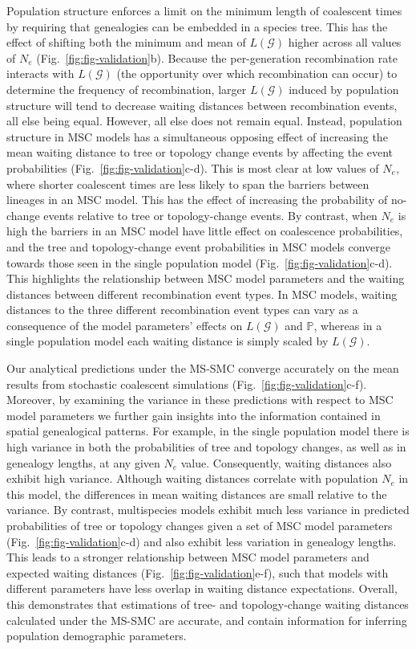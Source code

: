 \documentclass[11pt]{article}
\begin{document}
Population structure enforces a 
limit on the minimum length of coalescent 
times by requiring that genealogies can be embedded in a species tree.
This has the effect of shifting both the minimum and mean of 
$L(\mathcal{G})$ higher 
across all values of $N_e$ (Fig.~\ref{fig:fig-validation}b). 
Because the per-generation recombination rate interacts with
$L(\mathcal{G})$ (the opportunity over which recombination can occur) to
determine the frequency of recombination, larger $L(\mathcal{G})$ induced
by population structure will tend to decrease waiting distances between 
recombination events, all else being equal. 
However, all else does not remain equal.
Instead, population structure in MSC models has a simultaneous opposing effect
of increasing the mean waiting distance to tree or topology change events by 
affecting the event probabilities
(Fig.~\ref{fig:fig-validation}c-d).
This is most clear at low values of $N_e$, where shorter coalescent times are
less likely to span the barriers between lineages in an MSC model. 
This has the effect of increasing the probability of no-change events
relative to tree or topology-change events. By contrast, when $N_e$ is high the 
barriers in an MSC model have little effect on coalescence probabilities, and 
the tree and topology-change event probabilities in MSC models converge towards 
those seen in the single population model
(Fig.~\ref{fig:fig-validation}c-d). 
This highlights the relationship between MSC model parameters and the waiting 
distances between different recombination event types. In MSC models, waiting
distances to the three different recombination event types can vary as a 
consequence of the model parameters' effects on $L(\mathcal{G})$ and $\mathbb{P}$, 
whereas in a single population model each waiting distance is simply scaled 
by $L(\mathcal{G})$.


Our analytical predictions under the MS-SMC converge accurately on 
the mean results from stochastic coalescent simulations 
(Fig.~\ref{fig:fig-validation}c-f). 
Moreover, by examining the variance in these predictions with 
respect to MSC model parameters we further gain insights into 
the information contained in spatial genealogical patterns.
For example, in the single population model there is high variance 
in both the probabilities of tree and topology changes, as well as in genealogy
lengths, at any given $N_e$ value. Consequently, waiting distances also 
exhibit high variance. Although waiting distances correlate with population $N_e$ 
in this model, the differences in mean waiting distances are small relative to the variance. 
By contrast, multispecies models exhibit much less variance in predicted probabilities 
of tree or topology changes given a set of MSC model parameters 
(Fig.~\ref{fig:fig-validation}c-d) and also exhibit less variation in genealogy
lengths. This leads to a stronger relationship between MSC model parameters and 
expected waiting distances (Fig.~\ref{fig:fig-validation}e-f), such that models
with different parameters have less overlap in waiting distance expectations.
Overall, this demonstrates that estimations of tree- and topology-change
waiting distances calculated under the MS-SMC are accurate, and contain 
information for inferring population demographic parameters.
\end{document}

